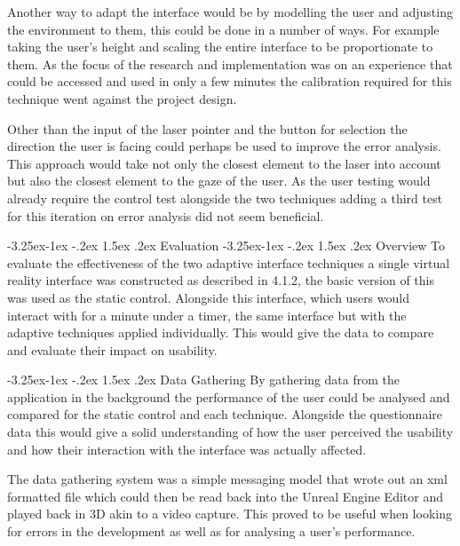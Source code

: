 \documentclass[12pt]{article}
\makeatletter
\renewcommand{\subsection}{\@startsection{subsection}{2}{\z@}%
             {-3.25ex\@plus -1ex \@minus -.2ex}%
             {1.5ex \@plus .2ex}%
             {\normalfont\large\scshape\bfseries}}
\renewcommand{\subsubsection}{\@startsection{subsubsection}{2}{\z@}%
             {-3.25ex\@plus -1ex \@minus -.2ex}%
             {1.5ex \@plus .2ex}%
             {\normalfont\normalsize\scshape\bfseries}}
\makeatother
\begin{document}
Another way to adapt the interface would be by modelling the user and adjusting the environment to them, this could be done in a number of ways. For example taking the user's height and scaling the entire interface to be proportionate to them. As the focus of the research and implementation was on an experience that could be accessed and used in only a few minutes the calibration required for this technique went against the project design.

Other than the input of the laser pointer and the button for selection the direction the user is facing could perhaps be used to improve the error analysis. This approach would take not only the closest element to the laser into account but also the closest element to the gaze of the user. As the user testing would already require the control test alongside the two techniques adding a third test for this iteration on error analysis did not seem beneficial.

\subsection{Evaluation}
\subsubsection{Overview}
To evaluate the effectiveness of the two adaptive interface techniques a single virtual reality interface was constructed as described in 4.1.2, the basic version of this was used as the static control. Alongside this interface, which users would interact with for a minute under a timer, the same interface but with the adaptive techniques applied individually. This would give the data to compare and evaluate their impact on usability.

\subsubsection{Data Gathering}
By gathering data from the application in the background the performance of the user could be analysed and compared for the static control and each technique. Alongside the questionnaire data this would give a solid understanding of how the user perceived the usability and how their interaction with the interface was actually affected.

The data gathering system was a simple messaging model that wrote out an xml formatted file which could then be read back into the Unreal Engine Editor and played back in 3D akin to a video capture. This proved to be useful when looking for errors in the development as well as for analysing a user's performance.
\end{document}
